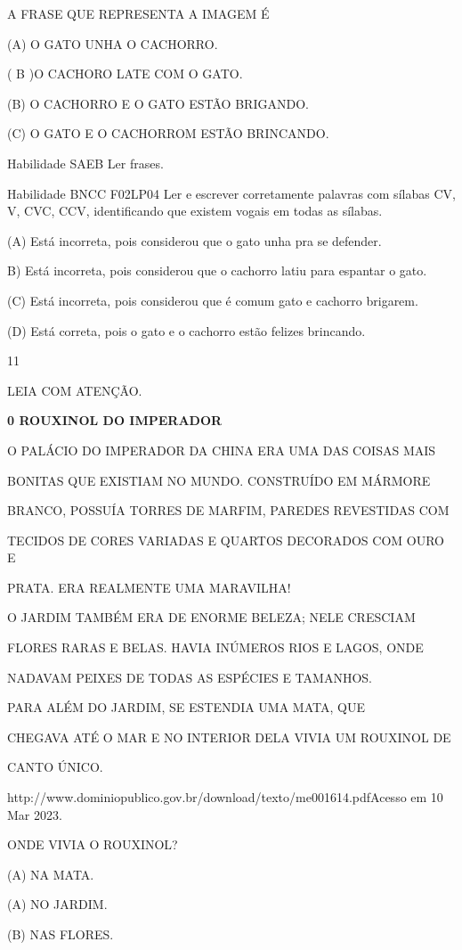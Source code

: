 {{{{{{A FRASE QUE REPRESENTA A IMAGEM É

(A) O GATO UNHA O CACHORRO.

( B )O CACHORO LATE COM O GATO.

(B) O CACHORRO E O GATO ESTÃO BRIGANDO.

(C) O GATO E O CACHORROM ESTÃO BRINCANDO.

\protect\hypertarget{_Hlk129376594}{}{}Habilidade SAEB Ler frases.

Habilidade BNCC F02LP04 Ler e escrever corretamente palavras com sílabas
CV, V, CVC, CCV, identificando que existem vogais em todas as sílabas.

(A) Está incorreta, pois considerou que o gato unha pra se defender.

B) Está incorreta, pois considerou que o cachorro latiu para espantar o
gato.

(C) Está incorreta, pois considerou que é comum gato e cachorro
brigarem.

(D) Está correta, pois o gato e o cachorro estão felizes brincando.

\num{11}

LEIA COM ATENÇÃO.

\textbf{0 ROUXINOL DO IMPERADOR}

O PALÁCIO DO IMPERADOR DA CHINA ERA UMA DAS COISAS MAIS

BONITAS QUE EXISTIAM NO MUNDO. CONSTRUÍDO EM MÁRMORE

BRANCO, POSSUÍA TORRES DE MARFIM, PAREDES REVESTIDAS COM

TECIDOS DE CORES VARIADAS E QUARTOS DECORADOS COM OURO E

PRATA. ERA REALMENTE UMA MARAVILHA!

O JARDIM TAMBÉM ERA DE ENORME BELEZA; NELE CRESCIAM

FLORES RARAS E BELAS. HAVIA INÚMEROS RIOS E LAGOS, ONDE

NADAVAM PEIXES DE TODAS AS ESPÉCIES E TAMANHOS.

PARA ALÉM DO JARDIM, SE ESTENDIA UMA MATA, QUE

CHEGAVA ATÉ O MAR E NO INTERIOR DELA VIVIA UM ROUXINOL DE

CANTO ÚNICO.

http://www.dominiopublico.gov.br/download/texto/me001614.pdfAcesso em 10
Mar 2023.

ONDE VIVIA O ROUXINOL?

(A) NA MATA.

(A) NO JARDIM.

(B) NAS FLORES.

}}}}}}
